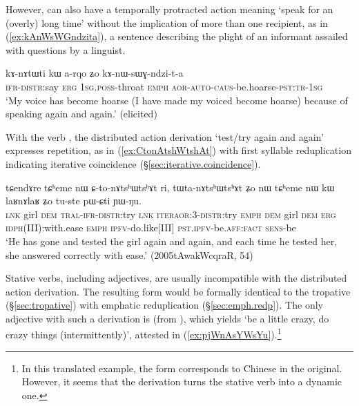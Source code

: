 However,  can also have a temporally protracted action meaning `speak for an (overly) long time' without the implication of more than one recipient, as in (\ref{ex:kAnWsWGndzita}), a sentence describing the plight of an informant assailed with questions by a linguist.

\begin{exe}
\ex \label{ex:kAnWsWGndzita}
\gll kɤ-nɤtɯti kɯ a-rqo ʑo kɤ-nɯ-sɯɣ-ndzi-t-a \\
\textsc{ifr}-\textsc{distr}:say \textsc{erg} \textsc{1sg}.\textsc{poss}-throat \textsc{emph} \textsc{aor}-\textsc{auto}-\textsc{caus}-be.hoarse-\textsc{pst}:\textsc{tr}-\textsc{1sg} \\
\glt `My voice has become hoarse (I have made my voiced become hoarse) because of speaking again and again.' (elicited)
\end{exe}

With the verb , the distributed action derivation  `test/try again and again' expresses repetition, as in (\ref{ex:CtonAtshWtshAt}) with first syllable reduplication indicating iterative coincidence (§\ref{sec:iterative.coincidence}).

\begin{exe}
\ex \label{ex:CtonAtshWtshAt}
\gll tɕendɤre tɕʰeme nɯ ɕ-to-nɤtsʰɯtsʰɤt ri, tɯ\redp{}ta-nɤtsʰɯtsʰɤt ʑo nɯ tɕʰeme nɯ kɯ laʁnɤlaʁ ʑo tu-ste pɯ-ɕti ɲɯ-ŋu. \\
\textsc{lnk} girl \textsc{dem} \textsc{tral}-\textsc{ifr}-\textsc{distr}:try \textsc{lnk} \textsc{iter}\redp{}\textsc{aor}:3\flobv{}-\textsc{distr}:try \textsc{emph} \textsc{dem} girl \textsc{dem} \textsc{erg} \textsc{idph}(III):with.ease \textsc{emph} \textsc{ipfv}-do.like[III] \textsc{pst}.\textsc{ipfv}-be.\textsc{aff}:\textsc{fact} \textsc{sens}-be \\
\glt `He has gone and tested the girl again and again, and each time he tested her, she answered correctly with ease.' (2005tAwakWcqraR, 54)
\end{exe}


Stative verbs, including adjectives, are usually incompatible with the distributed action derivation. The resulting form would be formally identical to the tropative (§\ref{sec:tropative}) with emphatic reduplication (§\ref{sec:emph.redp}). The only adjective with such a derivation is  (from ), which yields  `be a little crazy, do crazy things (intermittently)', attested in (\ref{ex:pjWnAsYWsYu}).\footnote{
In this translated example, the form  corresponds to Chinese  in the original. However, it seems that the derivation turns the stative verb into a dynamic one. } 

